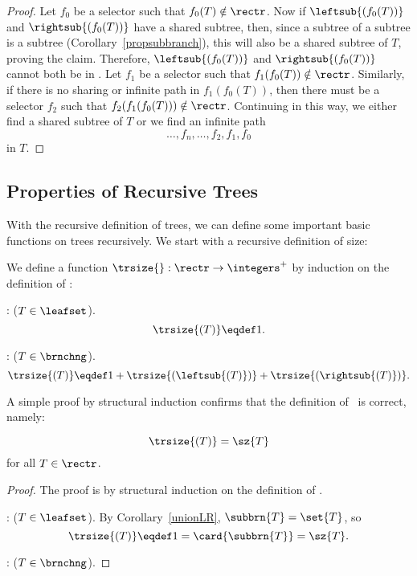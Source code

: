 \begin{definition}
\begin{proof}
Let $f_0$ be a selector such that $f_0(T) \notin \rectr$.  Now if
$\leftsub{(f_0(T))}$ and $\rightsub{(f_0(T))}$ have a shared subtree,
then, since a subtree of a subtree is a subtree
(Corollary~\ref{propsubbranch}), this will also be a shared subtree of
$T$, proving the claim.  Therefore, $\leftsub{(f_0(T))}$ and
$\rightsub{(f_0(T))}$ cannot both be in \rectr.  Let $f_1$ be a
selector such that $f_1(f_0(T)) \notin \rectr$.  Similarly, if there
is no sharing or infinite path in $f_1(f_0(T))$, then there must be a
selector $f_2$ such that $f_2(f_1(f_0(T))) \notin \rectr$.  Continuing
in this way, we either find a shared subtree of $T$ or we find an
infinite path
\[
\dots,f_n,\dots, f_2,f_1,f_0
\]
in $T$.
\end{proof}

\subsection{Properties of Recursive Trees}
With the recursive definition of trees, we can define some important
basic functions on trees recursively.  We start with a recursive
definition of size:
\begin{definition}
We define a function $\trsize{}: \rectr \to \integers^+$ by induction on
the definition of \rectr:

: ($T \in \leafset$).
\[
\trsize{(T)} \eqdef 1.
\]

: ($T \in \brnchng$).
\[
\trsize{(T)} \eqdef 1 + \trsize{(\leftsub{(T)})} + \trsize{(\rightsub{(T)})}.
\]
\end{definition}

A simple proof by structural induction confirms that the definition of
\trsize{}\ is correct, namely:
\begin{lemma}\label{}
\[
\trsize{(T)} = \sz{T}
\]
for all $T \in \rectr$.

\begin{proof}
The proof is by structural induction on the definition of \rectr.

: ($T \in \leafset$).
By Corollary~\ref{unionLR}, $\subbrn{T} = \set{T}$, so
\[
\trsize{(T)} \eqdef 1 = \card{\subbrn{T}} = \sz{T}.
\]

: ($T \in\brnchng$).


\end{proof}
\end{lemma}
\end{definition}
